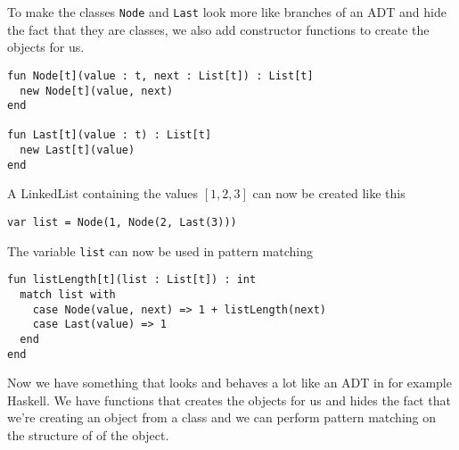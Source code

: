 \documentclass[10pt]{report}
\begin{document}
\par{\noindent To make the classes \texttt{Node} and \texttt{Last} look more like branches of an ADT and hide the fact that they are classes, we also add constructor functions to create the objects for us.}

\begin{lstlisting}[language=encore,caption={Constructor functions for Node and Last}]
fun Node[t](value : t, next : List[t]) : List[t]
  new Node[t](value, next)
end

fun Last[t](value : t) : List[t]
  new Last[t](value)
end
\end{lstlisting}

A LinkedList containing the values $[1, 2, 3]$ can now be created like this
\begin{lstlisting}[language=encore,caption={Creation of list containing three elements}]
var list = Node(1, Node(2, Last(3)))
\end{lstlisting}

The variable \texttt{list} can now be used in pattern matching

\begin{lstlisting}[language=encore,caption={Function that uses pattern matching to calculate the length of a list}]
fun listLength[t](list : List[t]) : int
  match list with
    case Node(value, next) => 1 + listLength(next)
    case Last(value) => 1
  end
end
\end{lstlisting}

\par{\noindent Now we have something that looks and behaves a lot like an ADT in for example Haskell. We have functions that creates the objects for us and hides the fact that we're creating an object from a class and we can perform pattern matching on the structure of of the object.}
\end{document}
